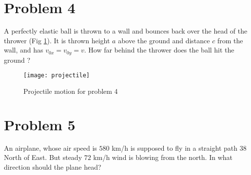 \documentclass[12pt]{article}
\begin{document}
  \section*{Problem 4}
A perfectly elastic ball is thrown to a wall and bounces back over the head of the thrower (Fig \ref{fig2}). It is thrown height $a$ above the ground and distance $c$ from the wall, and has $v_{0x}=v_{0y}=v$. How far behind the thrower does the ball hit the ground ?
\begin{figure}
\center
\texttt{[image: projectile]}
\caption{Projectile motion for problem 4}\label{fig2}
\end{figure}
 \section*{Problem 5}
An airplane, whose air speed is $580$ km/h is supposed to fly in a straight path $38$ North of East. But steady $72$ km/h wind is blowing from the north. In what direction should the plane head?
\end{document}
